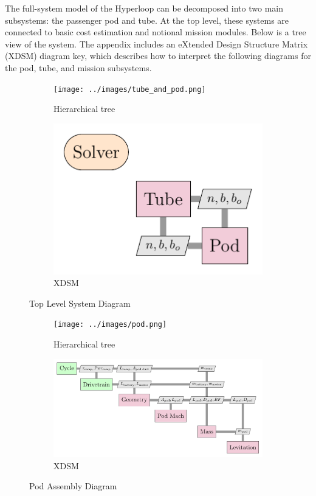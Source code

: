 The full-system model of the Hyperloop can be decomposed into two main
subsystems: the passenger pod and tube. At the top level, these systems are
connected to basic cost estimation and notional
mission modules. Below is a tree view of the system.
The appendix includes an eXtended Design Structure Matrix (XDSM) diagram key,
which describes how to interpret the following diagrams for the pod, tube, and mission subsystems.

\begin{figure}
\centering
\begin{subfigure}[t]{.4\textwidth}
  \centering
  \texttt{[image: ../images/tube\_and\_pod.png]}
  \caption{Hierarchical tree}
  \label{fig:tree:tube_and_pod}
\end{subfigure}%
\begin{subfigure}[t]{.6\textwidth}
  \centering
  \includegraphics[width=1.0\textwidth]{../images/xdsm/tube_and_pod.pdf}
  \caption{XDSM}
  \label{fig:xdsm:toplevel}
\end{subfigure}
\caption{Top Level System Diagram}
\label{fig:top}
\end{figure}

\begin{figure}
\centering
\begin{subfigure}[t]{.5\textwidth}
  \centering
  \texttt{[image: ../images/pod.png]}
  \caption{Hierarchical tree}
  \label{fig:tree:pod}
\end{subfigure}%
\begin{subfigure}[t]{.5\textwidth}
  \centering
  \includegraphics{../images/xdsm/pod.pdf}
  \caption{XDSM}
  \label{fig:xdsm:pod}
\end{subfigure}
\caption{Pod Assembly Diagram}
\label{fig:pod}
\end{figure}

